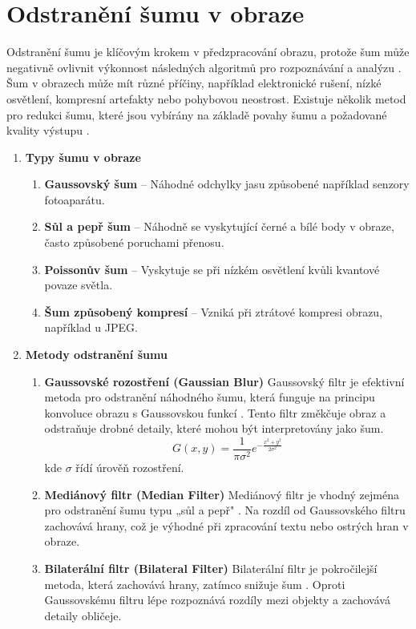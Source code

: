 \documentclass[FM,BP,CZ]{tulthesis}
\begin{document}
\section{Odstranění šumu v obraze}
Odstranění šumu je klíčovým krokem v předzpracování obrazu, protože šum může negativně ovlivnit výkonnost následných algoritmů pro rozpoznávání a analýzu \cite{gonzalez2018digital}. Šum v obrazech může mít různé příčiny, například elektronické rušení, nízké osvětlení, kompresní artefakty nebo pohybovou neostrost. Existuje několik metod pro redukci šumu, které jsou vybírány na základě povahy šumu a požadované kvality výstupu \cite{gonzalez2018digital}.
\begin{enumerate}

    \item \textbf{Typy šumu v obraze} \cite{gonzalez2018digital}
    \begin{enumerate}
        \item \textbf{Gaussovský šum} – Náhodné odchylky jasu způsobené například senzory fotoaparátu.
        \item \textbf{Sůl a pepř šum} – Náhodně se vyskytující černé a bílé body v obraze, často způsobené poruchami přenosu.
        \item \textbf{Poissonův šum} – Vyskytuje se při nízkém osvětlení kvůli kvantové povaze světla.
        \item \textbf{Šum způsobený kompresí} – Vzniká při ztrátové kompresi obrazu, například u JPEG.
    \end{enumerate}
    \item \textbf{Metody odstranění šumu}
    \begin{enumerate}
        \item \textbf{Gaussovské rozostření (Gaussian Blur)}
        \newline Gaussovský filtr je efektivní metoda pro odstranění náhodného šumu, která funguje na principu konvoluce obrazu s Gaussovskou funkcí \cite{gonzalez2018digital}. Tento filtr změkčuje obraz a odstraňuje drobné detaily, které mohou být interpretovány jako šum.
        \begin{equation}
            G(x,y) = \frac{1}{\pi \sigma^2} e^{-\frac{x^2+y^2}{2\sigma^2}}
        \end{equation}
        kde \( \sigma \) řídí úrověň rozostření.
    
        \item \textbf{Mediánový filtr (Median Filter)}
        \newline Mediánový filtr je vhodný zejména pro odstranění šumu typu „sůl a pepř" \cite{gonzalez2018digital}. Na rozdíl od Gaussovského filtru zachovává hrany, což je výhodné při zpracování textu nebo ostrých hran v obraze.
        \item \textbf{Bilaterální filtr (Bilateral Filter)}
        \newline Bilaterální filtr je pokročilejší metoda, která zachovává hrany, zatímco snižuje šum \cite{gonzalez2018digital}. Oproti Gaussovskému filtru lépe rozpoznává rozdíly mezi objekty a zachovává detaily obličeje.
    \end{enumerate}
\end{enumerate}
\end{document}
